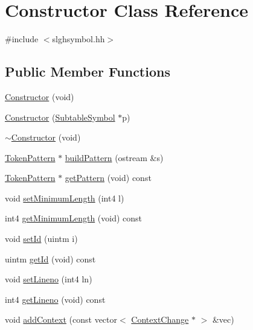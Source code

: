 \hypertarget{class_constructor}{}\section{Constructor Class Reference}
\label{class_constructor}


{\ttfamily \#include $<$slghsymbol.\+hh$>$}

\subsection*{Public Member Functions}
\begin{DoxyCompactItemize}
\item 
\mbox{\hyperlink{class_constructor_a4cd74cf3b3414093caa2af245108f0ed}{Constructor}} (void)
\item 
\mbox{\hyperlink{class_constructor_a4379cb3ed1419d20e6c9d8fe2e023e7e}{Constructor}} (\mbox{\hyperlink{class_subtable_symbol}{Subtable\+Symbol}} $\ast$p)
\item 
\mbox{\hyperlink{class_constructor_a7893d15db6b1fb50b277b99b872919ec}{$\sim$\+Constructor}} (void)
\item 
\mbox{\hyperlink{class_token_pattern}{Token\+Pattern}} $\ast$ \mbox{\hyperlink{class_constructor_a9c900244b8b33d73688c077a0f360812}{build\+Pattern}} (ostream \&s)
\item 
\mbox{\hyperlink{class_token_pattern}{Token\+Pattern}} $\ast$ \mbox{\hyperlink{class_constructor_a76864bc33c064d3afeb0cbdf65a5648a}{get\+Pattern}} (void) const
\item 
void \mbox{\hyperlink{class_constructor_a83b3646b2ab617b9a424c8d0ae3383f1}{set\+Minimum\+Length}} (int4 l)
\item 
int4 \mbox{\hyperlink{class_constructor_a577c1bfb784dc0db4be055dad2155ad5}{get\+Minimum\+Length}} (void) const
\item 
void \mbox{\hyperlink{class_constructor_a62e79d4c17ff80718c9a7d8ad58f1c08}{set\+Id}} (uintm i)
\item 
uintm \mbox{\hyperlink{class_constructor_aacdb7792f4b1b7cb3e2ed2ce18ad48e8}{get\+Id}} (void) const
\item 
void \mbox{\hyperlink{class_constructor_a4c6232d9e2bc08dd4a5fea7314dce4e9}{set\+Lineno}} (int4 ln)
\item 
int4 \mbox{\hyperlink{class_constructor_a0cbe5257839b6cebe5c820a634f6b9ed}{get\+Lineno}} (void) const
\item 
void \mbox{\hyperlink{class_constructor_ab2969cbbef94e7c2760064cf11a4f827}{add\+Context}} (const vector$<$ \mbox{\hyperlink{class_context_change}{Context\+Change}} $\ast$ $>$ \&vec)

\end{DoxyCompactItemize}
